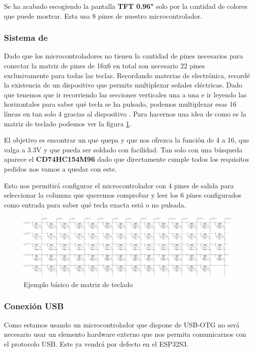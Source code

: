 Se ha acabado escogiendo la pantalla \textbf{\gls{TFT} 0.96"} solo por la cantidad de colores que puede mostrar. Esta usa 8 pines de nuestro microcontrolador.

\subsubsection{Sistema de }
Dado que los microcontroladores no tienen la cantidad de pines necesarios para conectar la matriz de pines de 16x6 en total son necesario 22 pines exclusivamente para todas las teclas. Recordando materias de electrónica, recordé la existencia de un dispositivo que permite multiplexar señales eléctricas. Dado que tenemos que ir recorriendo las secciones verticales una a una e ir leyendo las horizontales para saber qué tecla se ha pulsado, podemos multiplexar esas 16 líneas en tan solo 4 gracias al dispositivo . Para hacernos una idea de como es la matriz de teclado podemos ver la figura \ref{fig:EjemploArrayTeclado}.

El objetivo es encontrar un  que quepa y que nos ofrezca la función de 4 a 16, que valga a 3.3V y que pueda ser soldado con facilidad. Tan solo con una búsqueda aparece el \textbf{CD74HC154M96} dado que directamente cumple todos los requisitos pedidos nos vamos a quedar con este.

Esto nos permitirá configurar el microcontrolador con 4 pines de salida para seleccionar la columna que queremos comprobar y leer los 6 pines configurados como entrada para saber qué tecla exacta está o no pulsada.

\begin{figure}[H]
    \centering
    \includegraphics[width=1\textwidth]{imagenes/Capitulos/Cap03/EjemploArrayTeclado.png}
    \caption{Ejemplo básico de matriz de teclado \cite{EjemploArrayTeclado}}
    \label{fig:EjemploArrayTeclado}
\end{figure}

\newpage
\subsubsection{Conexión \gls{USB}} \label{DiseñoConexiones}
Como estamos usando un microcontrolador que dispone de \gls{USB}-OTG no será necesario usar un elemento hardware externo que nos permita comunicarnos con el protocolo \gls{USB}. Este ya vendrá por defecto en el ESP32S3.

